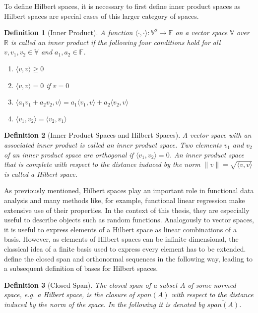 \documentclass[12pt, a4paper]{article}
\theoremstyle{MAstyle} \newtheorem{assumption}{Assumption}[section]
\theoremstyle{MAstyle} \newtheorem{definition}{Definition}[section]
\theoremstyle{MAstyle} \newtheorem{theorem}{Theorem}[section]
\begin{document}
			To define Hilbert spaces, it is necessary to first define inner product spaces as Hilbert spaces are special cases of this larger category of spaces.
			\begin{definition}[Inner Product]
				A function $\langle \cdot , \cdot \rangle : \mathbb{V}^2 \rightarrow \mathbb{F}$ on a vector space $\mathbb{V}$ over $\mathbb{R}$ is called an inner product if the following four conditions hold for all $v, v_1, v_2 \in \mathbb{V}$ and $a_1, a_2 \in \mathbb{F}$.
				\begin{multicols}{2}
					\begin{enumerate}
						\item $\langle v,v \rangle \geq 0$
						\item $\langle v,v \rangle = 0$ if $v = 0$
						\item $\langle a_1 v_1 + a_2 v_2, v \rangle = a_1 \langle v_1, v \rangle + a_2 \langle v_2, v \rangle$
						\item $\langle v_1, v_2 \rangle = \langle v_2, v_1 \rangle$
					\end{enumerate}
				\end{multicols}
			\end{definition}
			
			\begin{definition}[Inner Product Spaces and Hilbert Spaces]
				A vector space with an associated inner product is called an inner product space. Two elements $v_1$ and $v_2$ of an inner product space are orthogonal if $\langle v_1, v_2 \rangle = 0$.
				An inner product space that is complete with respect to the distance induced by the norm $\| v \| = \sqrt{\langle v, v\rangle}$ is called a Hilbert space.
			\end{definition}
			As previously mentioned, Hilbert spaces play an important role in functional data analysis and many methods like, for example, functional linear regression make extensive use of their properties. In the context of this thesis, they are especially useful to describe objects such as random functions.
			Analogously to vector spaces, it is useful to express elements of a Hilbert space as linear combinations of a basis. However, as elements of Hilbert spaces can be infinite dimensional, the classical idea of a finite basis used to express every element has to be extended. \cite{hsing_theoretical_2015} define the closed span and orthonormal sequences in the following way, leading to a subsequent definition of bases for Hilbert spaces.
		
			\begin{definition}[Closed Span]
				The closed span of a subset $A$ of some normed space, e.g. a Hilbert space, is the closure of $\textit{span}\left(A\right)$ with respect to the distance induced by the norm of the space. In the following it is denoted by $\overline{{\textit{span}\left(A\right)}}$.
			\end{definition}
		
\end{document}
